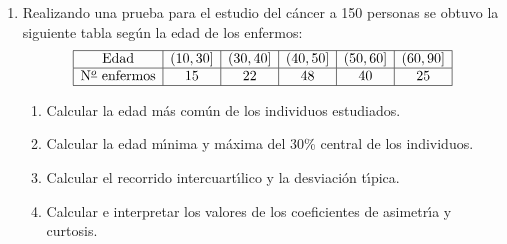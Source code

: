 \documentclass[11pt]{book}
\begin{document}
\begin{enumerate}
\vskip 0.4cm  \item Realizando una prueba para el estudio del  c{\'a}ncer  a  150  personas  se
    obtuvo la siguiente tabla seg{\'u}n la edad de los enfermos:
$$
  \begin{array}{|c|c|c|c|c|c|} \hline
 \mbox{Edad}        & (10,30] & (30,40] & (40,50] & (50,60] & (60,90] \\ \hline
 \mbox{N${}^{\underline{o}}$ enfermos} &   15  &   22  &   48  &   40  &  25   \\ \hline
   \end{array}
$$
  \begin{enumerate}
    \item Calcular la edad m{\'a}s com{\'u}n de los individuos estudiados.
    \item Calcular la edad m{\'\i}nima y m{\'a}xima del 30\% central de los individuos.
    \item Calcular el recorrido intercuart{\'\i}lico y la desviaci{\'o}n t{\'\i}pica.
    \item Calcular e interpretar los valores de los coeficientes de asimetr{\'\i}a y curtosis.
\end{enumerate}

\end{enumerate}
\end{document}

